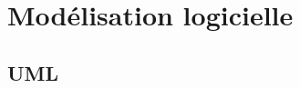 \part{Mod\'elisation logicielle}
\chapter{UML}\label{chap:uml}




\newpage


\newpage


\newpage


\newpage


\newpage




\newpage
